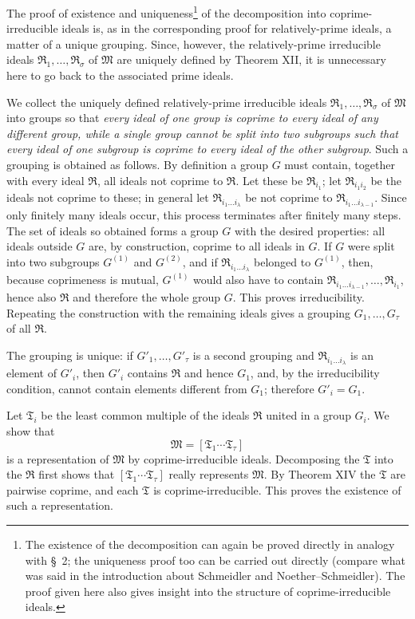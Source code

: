 \documentclass[11pt]{article}
\providecommand{\ideal}[1]{\mathfrak{#1}}
\begin{document}
The proof of existence and uniqueness\footnote{The existence of the decomposition can again be proved directly in analogy with \S~2; the uniqueness proof too can be carried out directly (compare what was said in the introduction about Schmeidler and Noether--Schmeidler). The proof given here also gives insight into the structure of coprime-irreducible ideals.} of the decomposition into coprime-irreducible ideals is, as in the corresponding proof for relatively-prime ideals, a matter of a unique grouping. Since, however, the relatively-prime irreducible ideals $\ideal R_1,
\ldots,\ideal R_\sigma$ of $\ideal M$ are uniquely defined by Theorem XII, it is unnecessary here to go back to the associated prime ideals.

We collect the uniquely defined relatively-prime irreducible ideals $\ideal R_1,
\ldots,\ideal R_\sigma$ of $\ideal M$ into groups so that \emph{every ideal of one group is coprime to every ideal of any different group, while a single group cannot be split into two subgroups such that every ideal of one subgroup is coprime to every ideal of the other subgroup}. Such a grouping is obtained as follows. By definition a group $G$ must contain, together with every ideal $\ideal R$, all ideals not coprime to $\ideal R$. Let these be $\ideal R_{i_1}$; let $\ideal R_{i_1i_2}$ be the ideals not coprime to these; in general let $\ideal R_{i_1\ldots i_\lambda}$ be not coprime to $\ideal R_{i_1\ldots i_{\lambda-1}}$. Since only finitely many ideals occur, this process terminates after finitely many steps. The set of ideals so obtained forms a group $G$ with the desired properties: all ideals outside $G$ are, by construction, coprime to all ideals in $G$. If $G$ were split into two subgroups $G^{(1)}$ and $G^{(2)}$, and if $\ideal R_{i_1\ldots i_\lambda}$ belonged to $G^{(1)}$, then, because coprimeness is mutual, $G^{(1)}$ would also have to contain $\ideal R_{i_1\ldots i_{\lambda-1}},
\ldots,\ideal R_{i_1}$, hence also $\ideal R$ and therefore the whole group $G$. This proves irreducibility. Repeating the construction with the remaining ideals gives a grouping $G_1,
\ldots,G_\tau$ of all $\ideal R$.

The grouping is unique: if $G'_1,
\ldots,G'_\tau$ is a second grouping and $\ideal R_{i_1\ldots i_\lambda}$ is an element of $G'_i$, then $G'_i$ contains $\ideal R$ and hence $G_1$, and, by the irreducibility condition, cannot contain elements different from $G_1$; therefore $G'_i=G_1$.

Let $\ideal T_i$ be the least common multiple of the ideals $\ideal R$ united in a group $G_i$. We show that
\[
 \ideal M=[\ideal T_1\cdots\ideal T_\tau]
\]
is a representation of $\ideal M$ by coprime-irreducible ideals. Decomposing the $\ideal T$ into the $\ideal R$ first shows that $[\ideal T_1\cdots\ideal T_\tau]$ really represents $\ideal M$. By Theorem XIV the $\ideal T$ are pairwise coprime, and each $\ideal T$ is coprime-irreducible. This proves the existence of such a representation.
\end{document}
